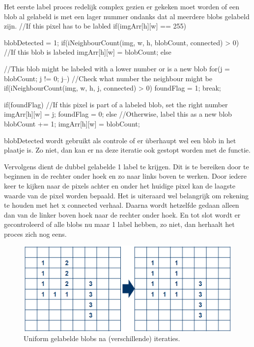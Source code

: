 Het eerste label proces redelijk complex gezien er gekeken moet worden of een 
blob al gelabeld is met een lager nummer ondanks dat al meerdere blobs gelabeld 
zijn.
//If this pixel has to be labled
if(imgArr[h][w] == 255){
  blobDetected = 1;
  if(iNeighbourCount(img, w, h, blobCount, connected) > 0){ //If this blob is labeled
      imgArr[h][w] = blobCount;
  } else { //This blob might be labeled with a lower number or is a new blob
      for(j = blobCount; j != 0; j--){ //Check what number the neighbour might be
          if(iNeighbourCount(img, w, h, j, connected) > 0){
              foundFlag = 1;
              break;
          }
      }

      if(foundFlag){ //If this pixel is part of a labeled blob, set the right number
          imgArr[h][w] = j;
          foundFlag = 0;
      } else { //Otherwise, label this as a new blob
          blobCount += 1;
          imgArr[h][w] = blobCount;
      }

  }
}
blobDetected wordt gebruikt als controle of er überhaupt wel een blob in het 
plaatje is. Zo niet, dan kan er na deze iteratie ook gestopt worden met de 
functie.

Vervolgens dient de dubbel gelabelde 1 label te krijgen. Dit is te bereiken 
door te beginnen in de rechter onder hoek en zo naar links boven te werken. 
Door iedere keer te kijken naar de pixels achter en onder het huidige pixel 
kan de laagste waarde van de pixel worden bepaald. Het is uiteraard wel 
belangrijk om rekening te houden met het x connected verhaal.
Daarna wordt hetzelfde gedaan alleen dan van de linker boven hoek naar de 
rechter onder hoek. En tot slot wordt er gecontroleerd of alle blobs nu 
maar 1 label hebben, zo niet, dan herhaalt het proces zich nog eens.

\begin{figure}
    \begin{center}
        \includegraphics[scale=0.5]{figures/label_blobs_step2.png}
    \end{center}
    \caption{Uniform gelabelde blobs na (verschillende) iteraties.}
    \label{fig:lbstep2}
\end{figure}

